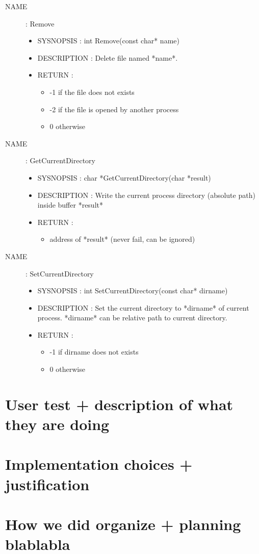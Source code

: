 \documentclass[a4paper,10pt]{article}
\begin{document}
\begin{description}
    \item [NAME] : Remove
        \begin{itemize}
            \item SYSNOPSIS : int Remove(const char* name)
            \item DESCRIPTION :
                Delete file named *name*.
            \item RETURN :
                \begin{itemize}
                    \item -1 if the file does not exists
                    \item -2 if the file is opened by another process
                    \item 0 otherwise
                \end{itemize}
        \end{itemize}

    \item [NAME] : GetCurrentDirectory
        \begin{itemize}
            \item SYSNOPSIS : char *GetCurrentDirectory(char *result)
            \item DESCRIPTION :
                Write the current process directory (absolute path) inside buffer *result*
            \item RETURN :
                \begin{itemize}
                    \item address of *result* (never fail, can be ignored)
                \end{itemize}
        \end{itemize}

    \item [NAME] : SetCurrentDirectory
        \begin{itemize}
            \item SYSNOPSIS : int SetCurrentDirectory(const char* dirname)
            \item DESCRIPTION :
                Set the current directory to *dirname* of current process.
                *dirname* can be relative path to current directory.
            \item RETURN :
                \begin{itemize}
                    \item -1 if dirname does not exists
                    \item 0 otherwise
                \end{itemize}
        \end{itemize}

    \end{description}


\section{User test + description of what they are doing}
\section{Implementation choices + justification}
\section{How we did organize + planning blablabla}
\end{document}
